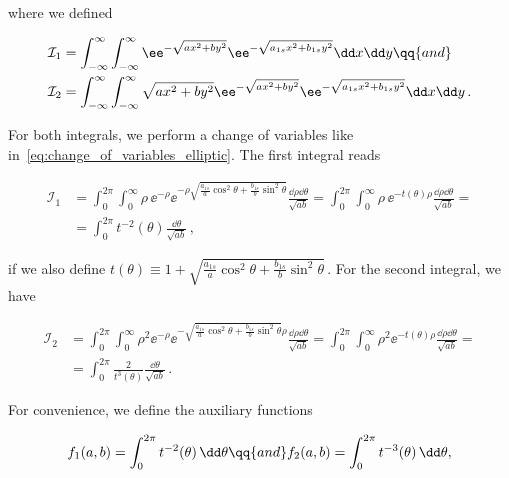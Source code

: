 \noindent where we defined

\begin{equation}
    \begin{aligned}
        \mathcal{I}_1 &= \int_{-\infty}^{\infty} \int_{-\infty}^{\infty}  \ee^{-\sqrt{ax^{2}+by^{2}}} \ee^{-\sqrt{a_{1s}x^{2}+b_{1s}y^{2}}} \dd x\dd y \qq{and} \\
        \mathcal{I}_2 &= \int_{-\infty}^{\infty} \int_{-\infty}^{\infty} \sqrt{ax^{2}+by^{2}} \ee^{-\sqrt{ax^{2}+by^{2}}} \ee^{-\sqrt{a_{1s}x^{2}+b_{1s}y^{2}}} \dd x \dd y \,.
    \end{aligned}
\end{equation}

\noindent For both integrals, we perform a change of variables like in~\eqref{eq:change_of_variables_elliptic}.
The first integral reads

\begin{equation}
    \begin{aligned}
        \mathcal{I}_1 &= \int_{0}^{2 \pi} \int_{0}^{\infty} \rho\, \ee^{-\rho} \ee^{-\rho \sqrt{\frac{a_{1s}}{a}\cos^2 \theta + \frac{b_{1s}}{b}\sin^2 \theta}} \frac{\dd \rho \dd\theta}{\sqrt{a b}} = \int_{0}^{2 \pi} \int_{0}^{\infty} \rho \, \ee^{- t(\theta) \rho} \frac{\dd \rho \dd \theta}{\sqrt{a b}} =\\
        &=  \int_{0}^{2 \pi} t^{-2}(\theta) \frac{\dd\theta}{\sqrt{a b}} \,,
    \end{aligned}
\end{equation}

\noindent if we also define $t(\theta) \equiv 1 + \sqrt{\frac{a_{1s}}{a}\cos^2 \theta + \frac{b_{1s}}{b}\sin^2 \theta}$\,.
For the second integral, we have

\begin{equation}
    \begin{aligned}
        \mathcal{I}_2 &= \int_{0}^{2 \pi} \int_{0}^{\infty} \rho^2 \ee^{-\rho} \ee^{-\sqrt{\frac{a_{1s}}{a}\cos^2 \theta + \frac{b_{1s}}{b}\sin^2 \theta} \rho } \frac{\dd \rho \dd \theta}{\sqrt{a b}} = \int_{0}^{2 \pi} \int_{0}^{\infty} \rho^2 \ee^{-t(\theta) \rho} \frac{\dd \rho \dd \theta}{\sqrt{a b}} =\\
        &=  \int_{0}^{2 \pi} \frac{2}{t^{3}(\theta)} \frac{\dd \theta}{\sqrt{a b}} \,.
    \end{aligned}
\end{equation}

\noindent For convenience, we define the auxiliary functions

\begin{equation}
    f_1 (a,b) = \int_{0}^{2 \pi} t^{-2}(\theta)\, \dd \theta \qq{and} f_2 (a,b) = \int_{0}^{2 \pi} t^{-3}(\theta)\, \dd \theta ,
\end{equation}


